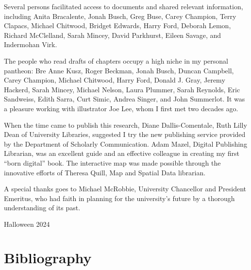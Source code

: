 \documentclass[
  american,
  letterpaper,
]{scrreprt}
\begin{document}
Several persons facilitated access to documents and shared relevant
information, including Anita Bracalente, Jonah Busch, Greg Buse, Carey
Champion, Terry Clapacs, Michael Chitwood, Bridget Edwards, Harry Ford,
Deborah Lemon, Richard McClelland, Sarah Mincey, David Parkhurst, Eileen
Savage, and Indermohan Virk.

The people who read drafts of chapters occupy a high niche in my
personal pantheon: Bre Anne Kusz, Roger Beckman, Jonah Busch, Duncan
Campbell, Carey Champion, Michael Chitwood, Harry Ford, Donald J. Gray,
Jeremy Hackerd, Sarah Mincey, Michael Nelson, Laura Plummer, Sarah
Reynolds, Eric Sandweiss, Edith Sarra, Curt Simic, Andrea Singer, and
John Summerlot. It was a pleasure working with illustrator Joe Lee, whom
I first met two decades ago.

When the time came to publish this research, Diane Dallis-Comentale,
Ruth Lilly Dean of University Libraries, suggested I try the new
publishing service provided by the Department of Scholarly
Communication. Adam Mazel, Digital Publishing Librarian, was an
excellent guide and an effective colleague in creating my first ``born
digital'' book. The interactive map was made possible through the
innovative efforts of Theresa Quill, Map and Spatial Data librarian.

A special thanks goes to Michael McRobbie, University Chancellor and
President Emeritus, who had faith in planning for the university's
future by a thorough understanding of its past.

\begin{flushright}
Halloween 2024
\end{flushright}


\chapter*{Bibliography}\label{bibliography}

\end{document}
